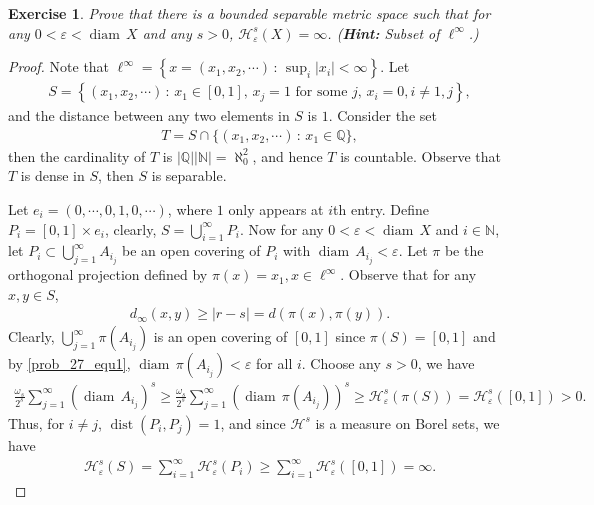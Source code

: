 \documentclass[11pt]{book}
\newtheorem{exercise}{Exercise}[chapter]
\theoremstyle{definition}
\numberwithin{equation}{chapter}
\def\H{{\mathcal H}}
\def\diam{{\operatorname{diam}\,}}
\begin{document}
\medskip

\begin{exercise}
Prove that there is a bounded separable metric space such that for any $0<\varepsilon<\diam X$ and any $s>0$, $\H^s_\varepsilon(X)=\infty$. ({\bf Hint:} Subset of $\ell^\infty$.)
\end{exercise}
\begin{proof}
Note that $\ell^\infty = \left\{x = (x_1,x_2,\cdots) \,:\, \sup_i \left|x_i\right| < \infty \right\}$. Let
\begin{align*}
    S = \left\{(x_1, x_2, \cdots) \,:\, x_1 \in [0,1],\, x_j = 1\,\, \text{for some $j$},\, x_i = 0, i \neq 1,j \right\},
\end{align*}
and the distance between any two elements in $S$ is $1$. Consider the set 
\begin{align*}
    T = S \cap \{(x_1, x_2, \cdots) \,:\, x_1 \in \mathbb{Q} \},
\end{align*}
then the cardinality of $T$ is $|\mathbb{Q}| |\mathbb{N}| = \aleph_0^2$, and hence $T$ is countable. Observe that $T$ is dense in $S$, then $S$ is separable. 

Let $e_i = (0,\cdots,0,1,0,\cdots)$, where $1$ only appears at $i$th entry. Define $P_i = [0,1] \times e_i$, clearly, $S = \bigcup^\infty_{i=1} P_i$. Now for any $0 < \varepsilon < \diam X$ and $i \in \mathbb{N}$, let $P_i \subset \bigcup^\infty_{j=1} A_{i_j}$ be an open covering of $P_i$ with $\diam A_{i_j} < \varepsilon$. Let $\pi$ be the orthogonal projection defined by $\pi(x) = x_1, x \in \ell^\infty$. Observe that for any $x, y \in S$,
\begin{align}\label{prob_27_equ1}
    d_\infty(x,y) \geq \left|r - s\right| = d(\pi(x),\pi(y)).
\end{align}
Clearly, $\bigcup^\infty_{j=1} \pi(A_{i_j})$ is an open covering of $[0,1]$ since $\pi(S) = [0,1]$ and by \eqref{prob_27_equ1}, $\diam \pi(A_{i_j}) < \varepsilon$ for all $i$. Choose any $s > 0$, we have
\begin{align*}
    \frac{\omega_s}{2^s} \sum^\infty_{j=1} (\diam A_{i_j})^s \geq \frac{\omega_s}{2^s} \sum^\infty_{j=1} (\diam \pi(A_{i_j}))^s \geq \mathcal{H}^s_{\varepsilon}(\pi(S)) = \mathcal{H}^s_{\varepsilon}([0,1]) > 0.
\end{align*}
Thus, for $i \neq j$, $\operatorname{dist}(P_i,P_j) = 1$, and since $\mathcal{H}^s$ is a measure on Borel sets, we have
\begin{align*}
    \mathcal{H}^s_\varepsilon(S) = \sum^\infty_{i=1} \mathcal{H}^s_\varepsilon(P_i) \geq \sum^\infty_{i=1} \mathcal{H}^s_{\varepsilon}([0,1]) = \infty.
\end{align*}
\end{proof}
\end{document}
